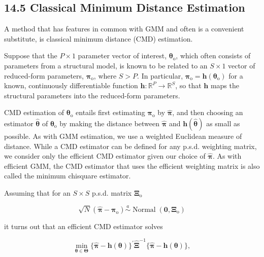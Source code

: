 \documentclass[10pt]{article}
\begin{document}
\subsection*{14.5 Classical Minimum Distance Estimation}
A method that has features in common with GMM and often is a convenient substitute, is classical minimum distance (CMD) estimation.

Suppose that the $P \times 1$ parameter vector of interest, $\boldsymbol{\theta}_{\mathrm{o}}$, which often consists of parameters from a structural model, is known to be related to an $S \times 1$ vector of reduced-form parameters, $\boldsymbol{\pi}_{\mathrm{o}}$, where $S>P$. In particular, $\boldsymbol{\pi}_{\mathrm{o}}=\mathbf{h}\left(\boldsymbol{\theta}_{\mathrm{o}}\right)$ for a known, continuously differentiable function $\mathbf{h}: \mathbb{R}^{P} \rightarrow \mathbb{R}^{S}$, so that $\mathbf{h}$ maps the structural parameters into the reduced-form parameters.

CMD estimation of $\boldsymbol{\theta}_{\mathrm{o}}$ entails first estimating $\boldsymbol{\pi}_{\mathrm{o}}$ by $\hat{\boldsymbol{\pi}}$, and then choosing an estimator $\hat{\boldsymbol{\theta}}$ of $\boldsymbol{\theta}_{\mathrm{o}}$ by making the distance between $\hat{\boldsymbol{\pi}}$ and $\mathbf{h}(\hat{\boldsymbol{\theta}})$ as small as possible. As with GMM estimation, we use a weighted Euclidean measure of distance. While a CMD estimator can be defined for any p.s.d. weighting matrix, we consider only the efficient CMD estimator given our choice of $\hat{\boldsymbol{\pi}}$. As with efficient GMM, the CMD estimator that uses the efficient weighting matrix is also called the minimum chisquare estimator.

Assuming that for an $S \times S$ p.s.d. matrix $\boldsymbol{\Xi}_{\mathrm{o}}$


\begin{equation*}
\sqrt{N}\left(\hat{\boldsymbol{\pi}}-\boldsymbol{\pi}_{\mathrm{o}}\right) \stackrel{a}{\sim} \operatorname{Normal}\left(\mathbf{0}, \boldsymbol{\Xi}_{\mathrm{o}}\right) \tag{14.63}
\end{equation*}


it turns out that an efficient CMD estimator solves


\begin{equation*}
\min _{\boldsymbol{\theta} \in \boldsymbol{\Theta}}\{\hat{\boldsymbol{\pi}}-\mathbf{h}(\boldsymbol{\theta})\}^{\prime} \hat{\boldsymbol{\Xi}}^{-1}\{\hat{\boldsymbol{\pi}}-\mathbf{h}(\boldsymbol{\theta})\}, \tag{14.64}
\end{equation*}
\end{document}
